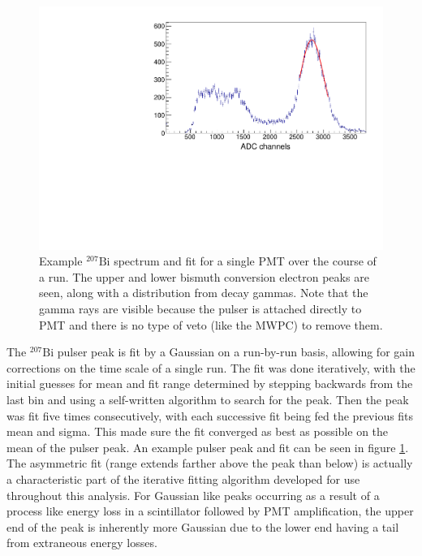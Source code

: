 \begin{figure}[h] 
\centering
\includegraphics[scale=.60]{3-UCNAAnalysis/gain_bismuth2.pdf}
\caption{Example $^{207}\mathrm{Bi}$ spectrum and fit for a single PMT over
  the course of a run. The upper and lower bismuth conversion electron peaks are
  seen, along with a distribution from decay gammas. Note that the gamma rays are
  visible because the pulser is attached directly to PMT and there is no type
  of veto (like the MWPC) to remove them.}
\label{fig:biPulser}
\end{figure}

The $^{207}\mathrm{Bi}$ pulser peak is fit by a Gaussian on a run-by-run basis, allowing for gain corrections on the time
scale of a single run. The fit was done iteratively, with the initial guesses for mean and fit range determined
by stepping backwards from the last bin and using a self-written algorithm to search for the peak. Then the peak
was fit five times consecutively, with each successive fit being fed the previous fits mean and sigma. This
made sure the fit converged as best as possible on the mean of the pulser peak. An example pulser peak and fit
can be seen in figure \ref{fig:biPulser}. The asymmetric fit (range extends farther above the peak than below)
is actually a characteristic part of the iterative
fitting algorithm developed for use throughout this analysis. For Gaussian like peaks occurring as a result of
a process like energy loss in a scintillator followed by PMT amplification, the upper end of the peak is
inherently more Gaussian due to the lower end having a tail from extraneous energy losses. 

